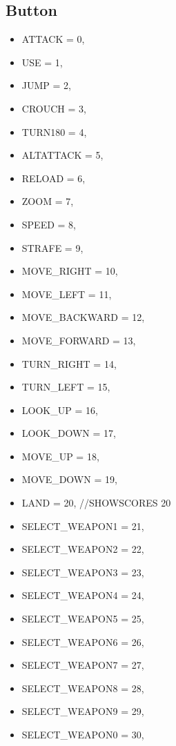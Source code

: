 \subsection{Button}
\begin{itemize}
\item ATTACK = 0,
\item         USE = 1,
\item         JUMP = 2,
\item         CROUCH = 3,
\item         TURN180 = 4,
\item         ALTATTACK = 5,
\item         RELOAD = 6,
\item         ZOOM = 7,

\item         SPEED = 8,
\item         STRAFE = 9,

\item         MOVE\_RIGHT = 10,
\item         MOVE\_LEFT = 11,
\item         MOVE\_BACKWARD = 12,
\item         MOVE\_FORWARD = 13,
\item         TURN\_RIGHT = 14,
\item         TURN\_LEFT = 15,
\item         LOOK\_UP = 16,
\item         LOOK\_DOWN = 17,
\item         MOVE\_UP = 18,
\item         MOVE\_DOWN = 19,
\item         LAND = 20,
        //SHOWSCORES 20

\item         SELECT\_WEAPON1 = 21,
\item         SELECT\_WEAPON2 = 22,
\item         SELECT\_WEAPON3 = 23,
\item         SELECT\_WEAPON4 = 24,
\item         SELECT\_WEAPON5 = 25,
\item         SELECT\_WEAPON6 = 26,
\item         SELECT\_WEAPON7 = 27,
\item         SELECT\_WEAPON8 = 28,
\item         SELECT\_WEAPON9 = 29,
 \item        SELECT\_WEAPON0 = 30,


\end{itemize}
